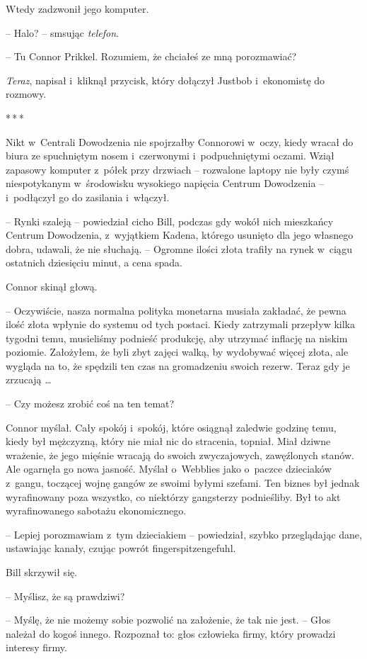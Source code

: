 \documentclass[oneside,polish,11pt,rmheadings]{mwbk}
\newcommand{\threeast}{\par\centerline{*\,*\,*}\medskip\par}
\begin{document}
Wtedy zadzwonił jego komputer.

-- Halo? -- smsując \textit{telefon}.

-- Tu Connor Prikkel. Rozumiem, że chciałeś ze mną porozmawiać?

\textit{Teraz}, napisał i~kliknął przycisk, który dołączył Justbob i~ekonomistę do rozmowy.

\bigskip
\threeast

Nikt w~Centrali Dowodzenia nie spojrzałby Connorowi w~oczy, kiedy wracał do biura ze spuchniętym nosem i~czerwonymi i~podpuchniętymi oczami. Wziął zapasowy komputer z~półek przy drzwiach -- rozwalone laptopy nie były czymś niespotykanym w~środowisku wysokiego napięcia Centrum Dowodzenia -- i~podłączył go do zasilania i~włączył.

-- Rynki szaleją -- powiedział cicho Bill, podczas gdy wokół nich mieszkańcy Centrum Dowodzenia, z~wyjątkiem Kadena, którego usunięto dla jego własnego dobra, udawali, że nie słuchają. -- Ogromne ilości złota trafiły na rynek w~ciągu ostatnich dziesięciu minut, a cena spada.

Connor skinął głową. 

-- Oczywiście, nasza normalna polityka monetarna musiała zakładać, że pewna ilość złota wpłynie do systemu od tych postaci. Kiedy zatrzymali przepływ kilka tygodni temu, musieliśmy podnieść produkcję, aby utrzymać inflację na niskim poziomie. Założyłem, że byli zbyt zajęci walką, by wydobywać więcej złota, ale wygląda na to, że spędzili ten czas na gromadzeniu swoich rezerw. Teraz gdy je zrzucają \ldots 

-- Czy możesz zrobić coś na ten temat? 

Connor myślał. Cały spokój i~spokój, które osiągnął zaledwie godzinę temu, kiedy był mężczyzną, który nie miał nic do stracenia, topniał. Miał dziwne wrażenie, że jego mięśnie wracają do swoich zwyczajowych, zawęźlonych stanów. Ale ogarnęła go nowa jasność. Myślał o~Webblies jako o~paczce dzieciaków z~gangu, toczącej wojnę gangów ze swoimi byłymi szefami. Ten biznes był jednak wyrafinowany poza wszystko, co niektórzy gangsterzy podnieśliby. Był to akt wyrafinowanego sabotażu ekonomicznego.

-- Lepiej porozmawiam z~tym dzieciakiem -- powiedział, szybko przeglądając dane, ustawiając kanały, czując powrót fingerspitzengefuhl.

Bill skrzywił się. 

-- Myślisz, że są prawdziwi?

-- Myślę, że nie możemy sobie pozwolić na założenie, że tak nie jest. -- Głos należał do kogoś innego. Rozpoznał to: głos człowieka firmy, który prowadzi interesy firmy.
\end{document}
